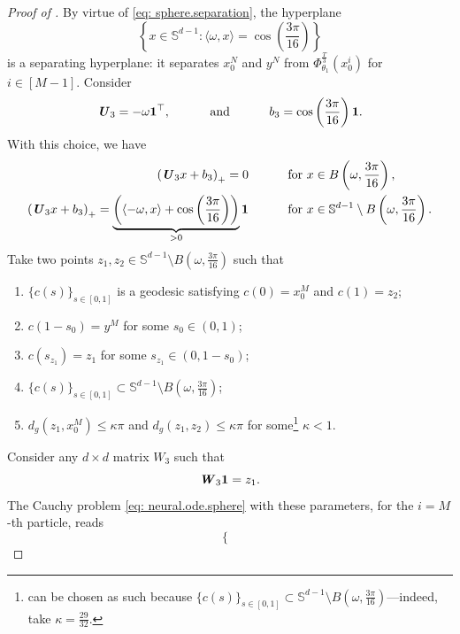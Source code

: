 \documentclass[a4paper,11pt]{article}
\theoremstyle{plain}
\renewcommand{\S}{\mathbb{S}^{d-1}}
\newcommand{\bW}{\bm{\mathit{W}}}
\newcommand{\bU}{\bm{\mathit{U}}}
\renewcommand{\leq}{\leqslant}
\numberwithin{equation}{section}
\begin{document}
\begin{proof}[Proof of ]
By virtue of \eqref{eq: sphere.separation}, the hyperplane
\begin{equation*}
\left\{x\in\S\colon\langle \omega, x\rangle =\cos\left(\frac{3\pi}{16}\right)\right\}
\end{equation*}
is a separating hyperplane: it separates $x_0^N$ and $y^N$ from $\Phi_{\theta_1}^{\frac{T}{3}}(x_0^i)$ for $i\in[M-1]$. Consider
\begin{align*}
\bU_3=-\omega {\bf1}^\top, \hspace{1cm} \text{ and } \hspace{1cm}
b_3=\cos\left(\frac{3\pi}{16}\right){\bf1}.
\end{align*}
With this choice, we have 
\begin{align*}
    \left( \bU_3x+b_3 \right)_+=0 \hspace{1cm} \text{ for } &x\in B\left(\omega, \frac{3\pi}{16}\right),\\
    \left( \bU_3x+b_3 \right)_+= \underbrace{\left(\langle -\omega, x\rangle+\cos\left(\frac{3\pi}{16}\right)\right)}_{>0} {\bf1} \hspace{1cm} \text{ for } &x\in \S\setminus B\left(\omega, \frac{3\pi}{16}\right).
\end{align*}
Take two points $z_1,z_2\in \S\setminus B\left(\omega, \frac{3\pi}{16}\right)$ such that
\begin{enumerate}
    \item $\{c(s)\}_{s\in[0,1]}$ is a geodesic satisfying $c(0)=x_0^M$ and $c(1)=z_2$;
    \item $c(1-s_0)=y^M$ for some $s_0\in(0,1)$;
    \item $c(s_{z_1})=z_1$ for some $s_{z_1}\in(0,1-s_0)$;
    \item $\{c(s)\}_{s\in[0,1]}\subset \S\setminus B\left(\omega, \frac{3\pi}{16}\right)$;
    \item $d_g(z_1,x_0^M)\leq \kappa\pi$ and $d_g(z_1,z_2)\leq \kappa\pi$ for some\footnote{can be chosen as such because $\{c(s)\}_{s\in[0,1]}\subset \S\setminus B\left(\omega,\frac{3\pi}{16}\right)$---indeed, take $\kappa=\frac{29}{32}$.} $\kappa<1$.
\end{enumerate}
Consider any $d\times d$ matrix $\bW_3$ such that
\begin{equation*}
\bW_3{\bf1}=z_1.
\end{equation*}
The Cauchy problem \eqref{eq: neural.ode.sphere} with these parameters, for the $i=M$-th particle, reads
\begin{equation}\label{eq: neural.ode.step3}
\begin{cases}

\end{cases}
\end{equation}
\end{proof}
\end{document}
